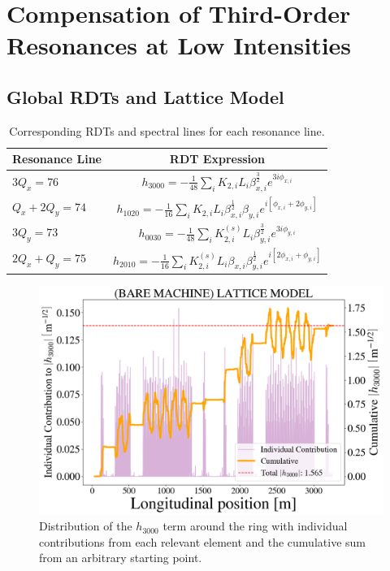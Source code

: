 \chapter{Compensation of Third-Order Resonances at Low Intensities}
\label{sec:ch4}

\section{Global RDTs and Lattice Model}

\begin{table}[H]
    \centering
    \caption{Corresponding RDTs and spectral lines for each resonance line.}
    \begin{tabular}{lc}
        \toprule
        \textbf{Resonance Line} & \textbf{RDT Expression} \\
        \midrule
            $3Q_x=76$     & $\displaystyle{h_{3000} = -\frac{1}{48}\sum_i K_{2,i} L_i \beta_{x,i}^{\frac{3}{2}} e^{3i\phi_{x,i}}}$    \\ %
           $Q_x+2Q_y=74$   &  $\displaystyle{h_{1020} = -\frac{1}{16} \sum_i K_{2,i} L_i \beta_{x,i}^{\frac{1}{2}} \beta_{y,i} e^{i \left[ \phi_{x,i} + 2\phi_{y,i}\right]} }$       \\ %
            $3Q_y=73$     &  $ \displaystyle{h_{0030} = -\frac{1}{48}\sum_i K_{2,i}^{(s)} L_i \beta_{y,i}^{\frac{3}{2}} e^{3i\phi_{y,i}}}$ \\ %
            $2Q_x+Q_y=75$   & $ \displaystyle{h_{2010} = -\frac{1}{16}\sum_i K_{2,i}^{(s)} L_i \beta_{x,i} \beta_{y,i}^{\frac{1}{2}} e^{i \left[ 2\phi_{x,i} + \phi_{y,i}\right]}}$       \\
        \bottomrule
    \end{tabular}
    \label{tab:rdts}
\end{table}

\begin{figure}[H]
    \centering
    \includegraphics[width=\columnwidth]{chapter4/h3000_bare.png}
    \caption{Distribution of the $h_{3000}$ term around the ring with individual contributions from each relevant element and the cumulative sum from an arbitrary starting point.}
    \label{fig:h3000bare}
\end{figure}

